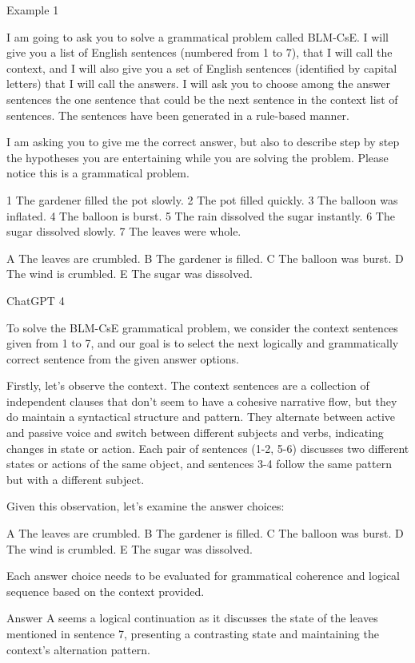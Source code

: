 Example 1 

I am going to ask you to solve a grammatical problem called BLM-CsE.  I will give you a list of English sentences (numbered from 1 to 7), that I will call the context, and I will also give you a set of English sentences (identified by capital letters) that I will call  the answers. I will ask you to choose among the answer sentences the one sentence that could be the next sentence in the context list of sentences. The sentences have been generated in a rule-based manner. 

I am asking you to give me the correct answer, but also to describe step by step  the hypotheses you are entertaining while you are solving the problem. Please notice this is a grammatical problem.


1 The gardener filled the pot slowly.
2 The pot filled quickly.
3 The balloon was inflated.
4 The balloon is burst.
5 The rain dissolved the sugar instantly.
6 The sugar dissolved slowly.
7 The leaves were whole.

A The leaves are crumbled.
B The gardener is filled.
C The balloon was burst.
D The wind is crumbled.
E The sugar was dissolved.

ChatGPT 4

To solve the BLM-CsE grammatical problem, we consider the context sentences given from 1 to 7, and our goal is to select the next logically and grammatically correct sentence from the given answer options.

Firstly, let's observe the context. The context sentences are a collection of independent clauses that don't seem to have a cohesive narrative flow, but they do maintain a syntactical structure and pattern. They alternate between active and passive voice and switch between different subjects and verbs, indicating changes in state or action. Each pair of sentences (1-2, 5-6) discusses two different states or actions of the same object, and sentences 3-4 follow the same pattern but with a different subject.

Given this observation, let's examine the answer choices:

A The leaves are crumbled.
B The gardener is filled.
C The balloon was burst.
D The wind is crumbled.
E The sugar was dissolved.

Each answer choice needs to be evaluated for grammatical coherence and logical sequence based on the context provided.

Answer A seems a logical continuation as it discusses the state of the leaves mentioned in sentence 7, presenting a contrasting state and maintaining the context's alternation pattern.

